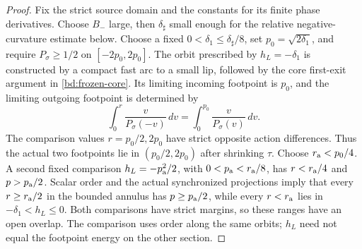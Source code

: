 \begin{proof}
Fix the strict source domain and the constants for its finite phase
derivatives. Choose $B_-$ large, then $\delta_\sharp$ small enough
for the relative negative-curvature estimate below. Choose a fixed $0<\delta_1\le\delta_\sharp/8$,
set $p_0=\sqrt{2\delta_1}$, and require $P_\sigma\ge1/2$ on
$[-2p_0,2p_0]$.
The orbit prescribed by \(h_L=-\delta_1\) is constructed by a
compact fast arc to a small lip, followed by the core first-exit
argument in \eqref{bd:frozen-core}.  Its limiting incoming footpoint
is \(p_0\), and the limiting outgoing footpoint is determined by
\[
 \int_0^r\frac{v}{P_\sigma(-v)}\,dv
       =\int_0^{p_0}\frac{v}{P_\sigma(v)}\,dv.
\]
The comparison values \(r=p_0/2,2p_0\) have strict opposite action
differences.  Thus the actual two footpoints lie in
\((p_0/2,2p_0)\) after shrinking \(\tau\).
Choose \(r_{\rm a}<p_0/4\).  A second fixed comparison
\(h_L=-p_{\rm a}^2/2\), with \(0<p_{\rm a}<r_{\rm a}/8\), has
\(r<r_{\rm a}/4\) and \(p>p_{\rm a}/2\).
Scalar order and the actual synchronized projections imply that
every \(r\ge r_{\rm a}/2\) in the bounded annulus has
\(p\ge p_{\rm a}/2\), while every \(r<r_{\rm a}\) lies in
\(-\delta_1<h_L\le0\).  Both comparisons have strict margins,
so these ranges have an open overlap.  The comparison uses order along the same orbits; \(h_L\) need not equal
the footpoint energy on the other section.


\end{proof}
